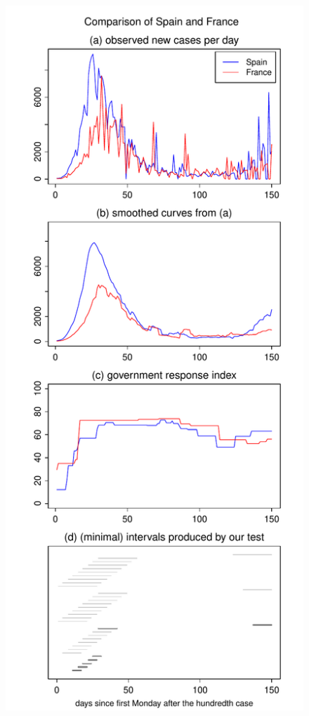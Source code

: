 \documentclass[a4paper,12pt]{article}
\numberwithin{equation}{section}
\begin{document}
{\begin{figure}[p!]
\begin{minipage}[t]{0.49\textwidth}
\includegraphics[width=\textwidth]{plots/ESP_vs_FRA_wa}

\end{minipage}
\end{figure}}
\end{document}
